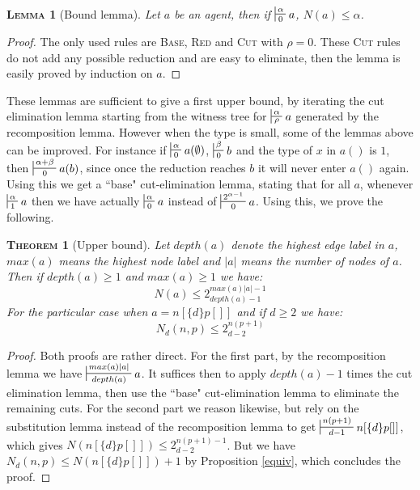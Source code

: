 \documentclass{article}
\newtheorem{lemma}{\textsc{Lemma}}
\newtheorem{theorem}{\textsc{Theorem}}
\begin{document}
\begin{lemma}[Bound lemma]
Let $a$ be an agent, then if $\sststile{0}{\alpha} a$, $N(a) \leq \alpha$.
\end{lemma}
\begin{proof}
The only used rules are \textsc{Base}, \textsc{Red} and \textsc{Cut} with $\rho = 0$. These \textsc{Cut} rules do not add any possible reduction and are easy to eliminate, then the lemma
is easily proved by induction on $a$.
\end{proof}

These lemmas are sufficient to give a first upper bound, by iterating the cut elimination lemma starting from the witness tree for $\sststile{\rho}{\alpha} a$ generated by the recomposition lemma. However when the
type is small, some of the lemmas above can be improved. For instance if $\sststile{0}{\alpha} a(\emptyset)$, $\sststile{0}{\beta} b$ and the type of $x$ in $a()$ is $1$, then $\sststile{0}{\alpha+\beta} a(b)$, 
since once the reduction reaches $b$ it will never enter $a()$ again. Using this we get a ``base" cut-elimination lemma, stating that for all $a$, whenever $\sststile{1}{\alpha} a$ then we have actually 
$\sststile{0}{\alpha} a$ instead of $\sststile{0}{2^{\alpha-1}} a$. Using this, we prove the following.

\begin{theorem}[Upper bound]
Let $depth(a)$ denote the highest edge label in $a$, $max(a)$ means the highest node label and $|a|$ means the number of nodes of $a$. Then if $depth(a)\geq 1$ and $max(a) \geq 1$ we have:
\[
N(a) \leq 2_{depth(a)-1}^{max(a)|a|-1}
\]
For the particular case when $a=n[\{d\}p[]]$ and if $d\geq 2$ we have:
\[
N_d(n, p) \leq 2_{d-2}^{n(p+1)}
\]
\end{theorem}
\begin{proof}
Both proofs are rather direct. For the first part, by the recomposition lemma we have $\sststile{depth(a)}{max(a)|a|} a$. It suffices then to apply $depth(a)-1$ times
the cut elimination lemma, then use the ``base" cut-elimination lemma to eliminate the remaining cuts. For the second part we reason likewise, but rely on the substitution lemma instead of the recomposition
lemma to get $\sststile{d-1}{n(p+1)} n[\{d\}p[]]$, which gives $N(n[\{d\}p[]]) \leq 2_{d-2}^{n(p+1)-1}$. But we have $N_d(n, p) \leq N(n[\{d\}p[]])+1$ by Proposition \ref{equiv}, which concludes the proof.
\end{proof}
\end{document}
